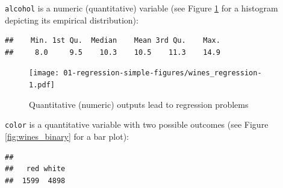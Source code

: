 \documentclass[10pt,b5paper,krantz1]{krantz}
\newenvironment{Shaded}{\begin{snugshade}}{\end{snugshade}}
\newcommand{\CommentTok}[1]{\textcolor[rgb]{0.37,0.37,0.37}{\textit{#1}}}
\newcommand{\DataTypeTok}[1]{\textcolor[rgb]{0.27,0.27,0.27}{#1}}
\newcommand{\DecValTok}[1]{\textcolor[rgb]{0.06,0.06,0.06}{#1}}
\newcommand{\KeywordTok}[1]{\textcolor[rgb]{0.27,0.27,0.27}{\textbf{#1}}}
\newcommand{\NormalTok}[1]{#1}
\newcommand{\OperatorTok}[1]{\textcolor[rgb]{0.43,0.43,0.43}{\textbf{#1}}}
\newcommand{\StringTok}[1]{\textcolor[rgb]{0.5,0.5,0.5}{#1}}
\begin{document}
\texttt{alcohol} is a numeric (quantitative) variable (see Figure \ref{fig:wines_regression} for a histogram depicting its empirical distribution):

\begin{Shaded}
\end{Shaded}

\begin{verbatim}
##    Min. 1st Qu.  Median    Mean 3rd Qu.    Max. 
##     8.0     9.5    10.3    10.5    11.3    14.9
\end{verbatim}

\begin{Shaded}
\end{Shaded}

\begin{figure}
\hypertarget{fig:wines_regression}{%
\centering
\texttt{[image: 01-regression-simple-figures/wines\_regression-1.pdf]}
\caption{Quantitative (numeric) outputs lead to regression problems}\label{fig:wines_regression}
}
\end{figure}

\texttt{color} is a quantitative variable with two possible outcomes (see Figure \ref{fig:wines_binary} for a bar plot):

\begin{Shaded}
\end{Shaded}

\begin{verbatim}
## 
##   red white 
##  1599  4898
\end{verbatim}

\begin{Shaded}
\end{Shaded}
\end{document}
